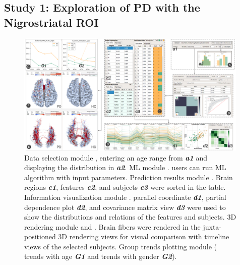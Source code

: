 

\subsection{Study 1: Exploration of PD with the Nigrostriatal ROI} %

\begin{figure}[t]
\centering
\includegraphics[width=0.99\textwidth]{images/fusiformSteps_v5.png}
\caption{ Data selection module , entering an age range from \textbf{\textit{a1}} and displaying the distribution in \textbf{\textit{a2}}. ML module . users can run ML algorithm with input parameters. Prediction results module . Brain regions \textbf{\textit{c1}}, features \textbf{\textit{c2}}, and subjects \textbf{\textit{c3}} were sorted in the table. Information visualization module . parallel coordinate \textbf{\textit{d1}}, partial dependence plot \textbf{\textit{d2}}, and covariance matrix view \textbf{\textit{d3}} were used to show the distributions and relations of the features and subjects. 3D rendering module  and . Brain fibers were rendered in the juxta-positioned 3D rendering views for visual comparison with timeline views of the selected subjects. Group trends plotting module  ( trends with age \textbf{\textit{G1}} and trends with gender \textbf{\textit{G2}}).}
\label{fig:fusformSteps}
\end{figure}

